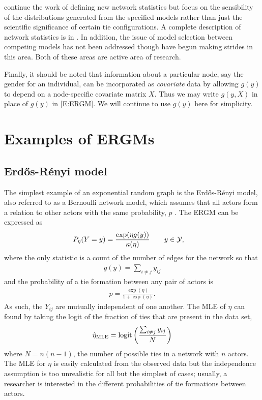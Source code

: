   \citet{Handcock:2006, Hunter:2006, recentp*} continue the work of defining new network statistics but focus on the sensibility of the distributions generated from the specified models rather than just the scientific significance of certain tie configurations.  A complete description of network statistics is in \citet{Morris:2008}.  In addition, the issue of model selection between competing models has not been addressed though \citet{GOF} have begun making strides in this area.  Both of these areas are active area of research.

Finally, it should be noted that information about a particular node, say the gender for an individual, can be incorporated as \textit{covariate} data by allowing $g(y)$ to depend on a node-specific covariate matrix $X$.  Thus we may write $g(y, X)$ in place of $g(y)$ in \eqref{E:ERGM}.  We will continue to use $g(y)$ here for simplicity.


\section{Examples of ERGMs}

\subsection{Erd\H{o}s-R\'{e}nyi model}
The simplest example of an exponential random graph is the Erd\H{o}s-R\'{e}nyi model, also referred to as a Bernoulli network model, which assumes that all actors form a relation to other actors with the same probability, $p$ \citep{Wasserman:1994, ergm}.  The ERGM can be expressed as
\begin{align*}
	P_{\eta}(Y=y) &= \frac{ \exp(\eta g(y) ) }{ \kappa( \eta) } \qquad y \in {\mathcal Y}, 
\end{align*}
where the only statistic is a count of the number of edges for the network so that
\begin{align*}
	g(y) = \sum_{i \neq j} y_{ij}
\end{align*}
and the probability of a tie formation between any pair of actors is
\begin{align*}
	p = \frac{\exp(\eta)}{1+ \exp(\eta)}.
\end{align*}
As such, the $Y_{ij}$ are mutually independent of one another.  
The MLE of $\eta$ can found by taking the logit of the fraction of ties that are present in the data set, 
\begin{align*}
	\hat{\eta}_{\textrm{MLE}} = \operatorname{logit} \left ( \frac{\sum_{i \neq j} y_{ij}}{ N } \right )
\end{align*}
where $N = n(n-1)$, the number of possible ties in a network with $n$ actors.  The MLE for $\eta$ is easily calculated from the observed data but the independence assumption is too unrealistic for all but the simplest of cases; usually, a researcher is interested in the different probabilities of tie formations between actors.


